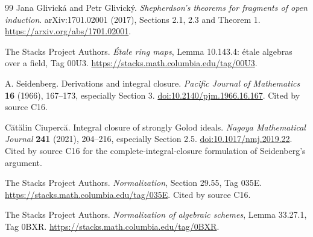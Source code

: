 \documentclass[11pt,oneside]{article}
\numberwithin{equation}{section}
\theoremstyle{definition}
\theoremstyle{remark}
\begin{document}
\begin{thebibliography}{99}
Jana Glivick\'a and Petr Glivick\'y.
\emph{Shepherdson's theorems for fragments of open induction}.
arXiv:1701.02001 (2017), Sections 2.1, 2.3 and Theorem 1.
\url{https://arxiv.org/abs/1701.02001}.

The Stacks Project Authors.
\emph{\'Etale ring maps}, Lemma 10.143.4: \'etale algebras over a field,
Tag 00U3. \url{https://stacks.math.columbia.edu/tag/00U3}.


A. Seidenberg.
Derivations and integral closure.
\emph{Pacific Journal of Mathematics} \textbf{16} (1966), 167--173, especially Section 3.
\href{https://doi.org/10.2140/pjm.1966.16.167}{doi:10.2140/pjm.1966.16.167}. Cited by
source C16.

C\u{a}t\u{a}lin Ciuperc\u{a}.
Integral closure of strongly Golod ideals.
\emph{Nagoya Mathematical Journal} \textbf{241} (2021), 204--216, especially Section 2.5.
\href{https://doi.org/10.1017/nmj.2019.22}{doi:10.1017/nmj.2019.22}. Cited by source C16
for the complete-integral-closure formulation of Seidenberg's argument.

The Stacks Project Authors.
\emph{Normalization}, Section 29.55, Tag 035E.
\url{https://stacks.math.columbia.edu/tag/035E}. Cited by source C16.

The Stacks Project Authors.
\emph{Normalization of algebraic schemes}, Lemma 33.27.1, Tag 0BXR.
\url{https://stacks.math.columbia.edu/tag/0BXR}.


\end{thebibliography}
\end{document}
